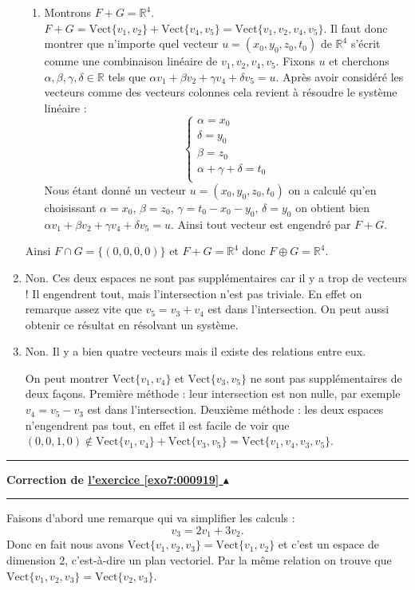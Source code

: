 \documentclass[11pt,a4paper]{article}
\newcommand{\Rr}{\mathbb{R}} \newcommand{\R}{\mathbb{R}}
\newcounter{exo}
\newcommand{\correction}[1]{\hypertarget{cor7:#1}{}\label{cor7:#1}{\bf Correction de \hyperlink{exo7:#1}{l'exercice \ref{exo7:#1} $\blacktriangle$}}\vspace{1mm}\hrule\vspace{1mm}}
\newcommand{\fincorrection}{\vspace{1mm}\hrule\vspace*{7mm}}
\begin{document}
\begin{enumerate}
\begin{enumerate}
     \item Montrons $F+G=\Rr^4$.
$F+G = \mbox{Vect}\{v_1,v_2\}+\mbox{Vect}\{v_4, v_5\}= \mbox{Vect}\{v_1,v_2,v_4, v_5\}$.
Il faut donc montrer que n'importe quel vecteur $u = (x_0,y_0,z_0,t_0)$ de $\Rr^4$ s'écrit comme une combinaison linéaire
de $v_1,v_2,v_4,v_5$. Fixons $u$ et cherchons $\alpha,\beta,\gamma,\delta \in \Rr$ tels que 
$\alpha v_1+\beta v_2 + \gamma v_4 + \delta v_5=u$.
Après avoir considéré les vecteurs comme des vecteurs colonnes cela revient à résoudre le système linéaire :
$$\begin{cases}
\alpha = x_0 \\
\delta = y_0 \\
\beta = z_0 \\
\alpha + \gamma + \delta = t_0 \\    
  \end{cases}$$
Nous étant donné un vecteur $u = (x_0,y_0,z_0,t_0)$ on a calculé qu'en choisissant 
$\alpha = x_0$, $\beta=z_0$, $\gamma= t_0 -x_0-y_0$, $\delta=y_0$ on obtient bien
$\alpha v_1+\beta v_2 + \gamma v_4 + \delta v_5=u$.
Ainsi tout vecteur est engendré par $F+G$.
  \end{enumerate}
Ainsi $F\cap G =\{ (0,0,0,0) \}$ et $F+G=\Rr^4$ donc $F \oplus G = \Rr^4$.


\item Non. Ces deux espaces ne sont pas suppl\'ementaires car il y a trop de vecteurs !
Il engendrent tout, mais l'intersection n'est pas triviale. En effet on remarque assez vite que 
$v_5=v_3+v_4$ est dans l'intersection. On peut aussi obtenir ce r\'esultat en résolvant un syst\`eme.

\item Non. Il y a bien quatre vecteurs mais il existe des relations entre eux.

On peut montrer $\mbox{Vect}\{v_1,v_4\}$ et $\mbox{Vect}\{v_3, v_5\}$ ne sont pas supplémentaires
de deux façons. Première méthode : leur intersection est non nulle, par exemple
$v_4=v_5-v_3$ est dans l'intersection. Deuxième méthode : les deux espaces n'engendrent pas tout,
en effet il est facile de voir que $(0,0,1,0) \notin \mbox{Vect}\{v_1,v_4\} + \mbox{Vect}\{v_3, v_5\} 
= \mbox{Vect}\{v_1,v_4,v_3, v_5\}$.


\end{enumerate}
\fincorrection
\correction{000919}
Faisons d'abord une remarque qui va simplifier les calculs : 
$$v_3 = 2v_1+3v_2.$$
 Donc en fait nous avons 
$\text{Vect} \{v_1,v_2,v_3\}= \text{Vect}\{v_1,v_2\}$ et c'est un espace de dimension $2$, c'est-à-dire un plan vectoriel.
Par la m\^eme relation on trouve que $\text{Vect} \{v_1,v_2,v_3\}= \text{Vect}\{v_2,v_3\}$.
\end{document}
